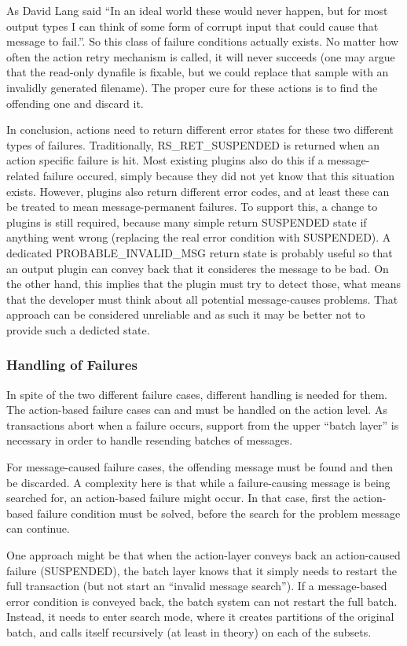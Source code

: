 \documentclass[a4paper,10pt]{article}
\begin{document}
As David Lang said ``In an ideal world these would never happen, but for most output types I can think of some form of corrupt input that could cause that message to fail.''.
So this class of failure conditions actually exists. No matter how often the action retry mechanism is called, it will never succeeds (one may argue that the read-only dynafile is fixable, but we could replace that sample with an invalidly generated filename). The proper cure for these actions is to find the offending one and discard it.

In conclusion, actions need to return different error states for these two different types of failures. Traditionally, RS\_RET\_SUSPENDED is returned when an action specific failure is hit. Most existing plugins also do this if a message-related failure occured, simply because they did not yet know that this situation exists. However, plugins also return different error codes, and at least these can be treated to mean message-permanent failures. To support this, a change to plugins is still required, because many simple return SUSPENDED state if anything went wrong (replacing the real error condition with SUSPENDED). A dedicated PROBABLE\_INVALID\_MSG return state is probably useful so that an output plugin can convey back that it consideres the message to be bad. On the other hand, this implies that the plugin must try to detect those, what means that the developer must think about all potential message-causes problems. That approach can be considered unreliable and as such it may be better not to provide such a dedicted state.

\subsubsection{Handling of Failures}
In spite of the two different failure cases, different handling is needed for them. The action-based failure cases can and must be handled on the action level. As transactions abort when a failure occurs, support from the upper ``batch layer'' is necessary in order to handle resending batches of messages.

For message-caused failure cases, the offending message must be found and then be discarded. A complexity here is that while a failure-causing message is being searched for, an action-based failure might occur. In that case, first the action-based failure condition must be solved, before the search for the problem message can continue.

One approach might be that when the action-layer conveys back an action-caused failure (SUSPENDED), the batch layer knows that it simply needs to restart the full transaction (but not start an ``invalid message search''). If a message-based error condition is conveyed back, the batch system can not restart the full batch. Instead, it needs to enter search mode, where it creates partitions of the original batch, and calls itself recursively (at least in theory) on each of the subsets.
\end{document}
